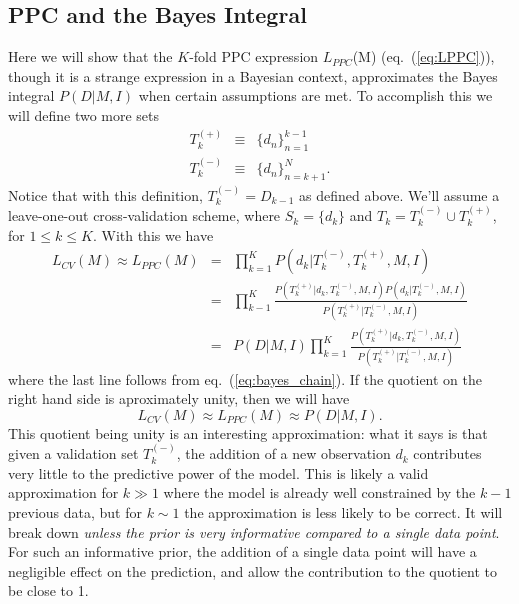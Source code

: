 \documentclass[12pt]{article}
\newcommand{\LCV}[1]{\ensuremath{L_{CV}}(#1)}
\newcommand{\LPPC}[1]{\ensuremath{L_{PPC}}(#1)}
\newcommand{\Tkplus}{\ensuremath{T_k^{(+)}}}
\newcommand{\Tkminus}{\ensuremath{T_k^{(-)}}}
\newcommand{\eqn}[1]{eq.~(\ref{eq:#1})}
\begin{document}
\subsection{PPC and the Bayes Integral}
Here we will show that the $K$-fold PPC expression \LPPC{M} (\eqn{LPPC}),
though it is a strange expression in a Bayesian context, approximates the
Bayes integral $P(D|M,I)$ when certain assumptions are met.
To accomplish this we will define two more sets
\begin{eqnarray}
  \Tkplus &\equiv& \{d_n\}_{n=1}^{k-1}\\
  \Tkminus &\equiv& \{d_n\}_{n=k+1}^N.
\end{eqnarray}
Notice that with this definition, $\Tkminus = D_{k-1}$ as defined above.
We'll assume a leave-one-out cross-validation scheme, where $S_k =\{d_k\}$
and $T_k = \Tkminus \cup \Tkplus$, for $1 \le k \le K$.  With this we
have
\begin{eqnarray}
  \LCV{M} \approx \LPPC{M} &=& \prod_{k=1}^K P(d_k|\Tkminus,\Tkplus,M,I)\\
         &=& \prod_{k-1}^K \frac{P(\Tkplus|d_k,\Tkminus,M,I) P(d_k|\Tkminus,M,I)}
                               {P(\Tkplus|\Tkminus,M,I)}\\
         &=& P(D|M,I) \prod_{k=1}^K \frac{P(\Tkplus|d_k,\Tkminus,M,I)}
                                        {P(\Tkplus|\Tkminus,M,I)}
\end{eqnarray}
where the last line follows from \eqn{bayes_chain}.
If the quotient on the right hand side is aproximately unity, then we will
have
\begin{equation}
  \LCV{M} \approx \LPPC{M} \approx P(D|M,I).
\end{equation}
This quotient being unity is an interesting approximation: what it says is that
given a validation set \Tkminus{}, the addition of a new observation $d_k$
contributes very little to the predictive power of the model.  This is likely
a valid approximation for $k \gg 1$ where the model is already well constrained
by the $k-1$ previous data, but for $k \sim 1$ the approximation is less
likely to be correct.  It will break down
{\it unless the prior is very informative compared to a single data point}.
For such an informative prior, the addition of a single data point will
have a negligible effect on the prediction, and allow the contribution to the
quotient to be close to 1.
\end{document}
